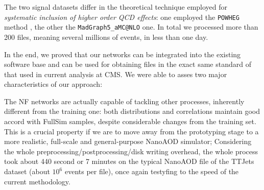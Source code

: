 \begin{figure}
\end{figure}

The two signal datasets differ in the theoretical technique employed for \emph{systematic inclusion of higher order QCD effects}: one employed the \texttt{POWHEG} method \cite{Nason_2004}, the other the \texttt{MadGraph5\_aMC@NLO} \cite{powpow} one.
In total we processed more than 200 files, meaning several millions of events, in less than one day.

In the end, we proved that our networks can be integrated into the existing software base and can be used for obtaining files in the exact same standard of that used in current analysis at CMS. We were able to asses two major characteristics of our approach:

\begin{outline}
    \1 The NF networks are actually capable of tackling other processes, inherently different from the training one: both distributions and correlations maintain good accord with FullSim samples, despite considerable changes from the training set. This is a crucial property if we are to move away from the prototyping stage to a more realistic, full-scale and general-purpose NanoAOD simulator;
    \1 Considering the whole preprocessing/postprocessing/disk writing overhead, the whole process took about 440 second or 7 minutes on the typical NanoAOD file of the TTJets dataset (about $10^{6}$ events per file), once again testyfing to the speed of the current methodology.
\end{outline}